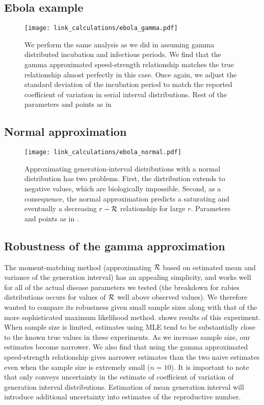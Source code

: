 
\setcounter{figure}{0}
\renewcommand{\thefigure}{S\arabic{figure}}

\subsection{Ebola example}

\begin{figure}[htbp] \centering
	\texttt{[image: link\_calculations/ebola\_gamma.pdf]}
\caption{
We perform the same analysis as we did in  assuming gamma distributed incubation and infectious periods. 
We find that the gamma approximated speed-strength relationship matches the true relationship almost perfectly in this case.
Once again, we adjust the standard deviation of the incubation period to match the reported coefficient of variation in serial interval distributions. Rest of the parameters and points as in 
}
	\label{fig:ebolaNormal}
\end{figure}

\subsection{Normal approximation}

\begin{figure}[htbp] \centering
	\texttt{[image: link\_calculations/ebola\_normal.pdf]}
\caption{
Approximating generation-interval distributions with a normal distribution has two problems. First, the distribution extends to negative values, which are biologically impossible. Second, as a consequence, the normal approximation predicts a saturating and eventually a decreasing $r-{\cal R}$ relationship for large $r$. Parameters and points as in .
}
	\label{fig:ebolaNormal}
\end{figure}

\subsection{Robustness of the gamma approximation}

The moment-matching method (approximating ${\cal R}$ based on estimated mean and variance of the generation interval) has an appealing simplicity, and works well for all of the actual disease parameters we tested (the breakdown for rabies distributions occurs for values of ${\cal R}$ well above observed values). We therefore wanted to compare its robustness given small sample sizes along with that of the more sophisticated maximum likelihood method.  shows results of this experiment. When sample size is limited, estimates using MLE tend to be substantially close to the known true values in these experiments. 
As we increase sample size, our estimates become narrower. 
We also find that using the gamma approximated speed-strength relationship gives narrower estimates than the two naive estimates even when the sample size is extremely small ($n = 10$).
It is important to note that  only conveys uncertainty in the estimate of coefficient of variation of generation interval distributions.
Estimation of mean generation interval will introduce additional uncertainty into estimates of the reproductive number. 

